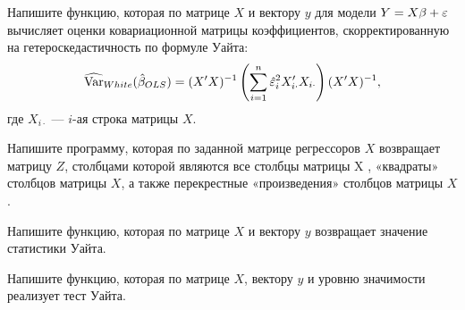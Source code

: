 \begin{problem}
Напишите функцию, которая по матрице $X$ и вектору $y$ для модели $Y=X\beta+\varepsilon$ вычисляет оценки ковариационной матрицы коэффициентов, скорректированную на гетероскедастичность по формуле Уайта:
\[
\widehat{\operatorname{Var}}_{White}(\hat{\beta}_{OLS})=(X'X)^{-1} \left( \sum_{i=1}^n \hat{\varepsilon}_i^2 X_{i\cdot}'X_{i\cdot} \right) (X'X)^{-1},
\]
где $X_{i\cdot}$ — $i$-ая строка матрицы $X$.


\begin{sol}
\end{sol}
\end{problem}


\begin{problem}
Напишите программу, которая по заданной матрице регрессоров $X$
возвращает матрицу $Z$, столбцами которой являются все столбцы матрицы X ,
«квадраты» столбцов матрицы $X$, а также перекрестные «произведения» столбцов
матрицы $X$.

\begin{sol}
\end{sol}
\end{problem}



\begin{problem}
Напишите функцию, которая по матрице $X$ и вектору $y$ возвращает
значение статистики Уайта.

\begin{sol}
\end{sol}
\end{problem}



\begin{problem}
Напишите функцию, которая по матрице $X$, вектору $y$ и уровню
значимости реализует тест Уайта.


\begin{sol}
\end{sol}
\end{problem}



